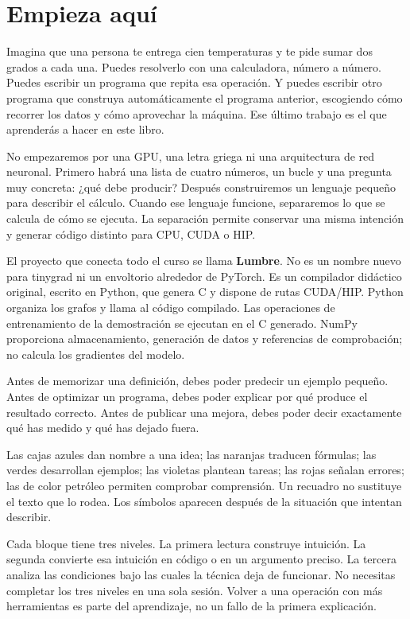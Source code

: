 \documentclass[12pt,a4paper,oneside]{report}
\begin{document}
\chapter*{Empieza aquí}
Imagina que una persona te entrega cien temperaturas y te pide sumar dos grados a cada una. Puedes resolverlo con una calculadora, número a número. Puedes escribir un programa que repita esa operación. Y puedes escribir otro programa que construya automáticamente el programa anterior, escogiendo cómo recorrer los datos y cómo aprovechar la máquina. Ese último trabajo es el que aprenderás a hacer en este libro.

No empezaremos por una GPU, una letra griega ni una arquitectura de red neuronal. Primero habrá una lista de cuatro números, un bucle y una pregunta muy concreta: ¿qué debe producir? Después construiremos un lenguaje pequeño para describir el cálculo. Cuando ese lenguaje funcione, separaremos lo que se calcula de cómo se ejecuta. La separación permite conservar una misma intención y generar código distinto para CPU, CUDA o HIP.

El proyecto que conecta todo el curso se llama \textbf{Lumbre}. No es un nombre nuevo para tinygrad ni un envoltorio alrededor de PyTorch. Es un compilador didáctico original, escrito en Python, que genera C y dispone de rutas CUDA/HIP. Python organiza los grafos y llama al código compilado. Las operaciones de entrenamiento de la demostración se ejecutan en el C generado. NumPy proporciona almacenamiento, generación de datos y referencias de comprobación; no calcula los gradientes del modelo.

\begin{idea}
Antes de memorizar una definición, debes poder predecir un ejemplo pequeño. Antes de optimizar un programa, debes poder explicar por qué produce el resultado correcto. Antes de publicar una mejora, debes poder decir exactamente qué has medido y qué has dejado fuera.

\end{idea}
Las cajas azules dan nombre a una idea; las naranjas traducen fórmulas; las verdes desarrollan ejemplos; las violetas plantean tareas; las rojas señalan errores; las de color petróleo permiten comprobar comprensión. Un recuadro no sustituye el texto que lo rodea. Los símbolos aparecen después de la situación que intentan describir.

Cada bloque tiene tres niveles. La primera lectura construye intuición. La segunda convierte esa intuición en código o en un argumento preciso. La tercera analiza las condiciones bajo las cuales la técnica deja de funcionar. No necesitas completar los tres niveles en una sola sesión. Volver a una operación con más herramientas es parte del aprendizaje, no un fallo de la primera explicación.
\end{document}
